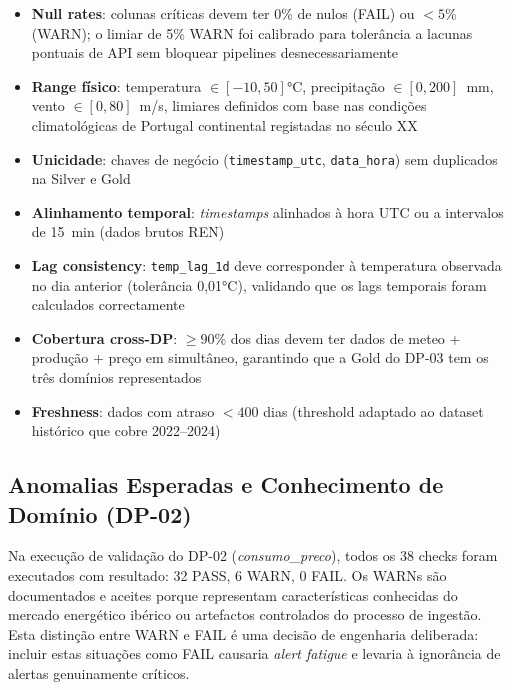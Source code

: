 \documentclass[11pt,a4paper]{article}
\begin{document}
\begin{itemize}[leftmargin=*,noitemsep]
  \item \textbf{Null rates}: colunas críticas devem ter 0\% de nulos (FAIL) ou $<5$\% (WARN); o limiar de 5\% WARN foi calibrado para tolerância a lacunas pontuais de API sem bloquear pipelines desnecessariamente
  \item \textbf{Range físico}: temperatura $\in [-10, 50]$°C, precipitação $\in [0, 200]$~mm, vento $\in [0, 80]$~m/s, limiares definidos com base nas condições climatológicas de Portugal continental registadas no século XX
  \item \textbf{Unicidade}: chaves de negócio (\texttt{timestamp\_utc}, \texttt{data\_hora}) sem duplicados na Silver e Gold
  \item \textbf{Alinhamento temporal}: \textit{timestamps} alinhados à hora UTC ou a intervalos de 15~min (dados brutos REN)
  \item \textbf{Lag consistency}: \texttt{temp\_lag\_1d} deve corresponder à temperatura observada no dia anterior (tolerância 0,01°C), validando que os lags temporais foram calculados correctamente
  \item \textbf{Cobertura cross-DP}: $\geq 90$\% dos dias devem ter dados de meteo + produção + preço em simultâneo, garantindo que a Gold do DP-03 tem os três domínios representados
  \item \textbf{Freshness}: dados com atraso $< 400$ dias (threshold adaptado ao dataset histórico que cobre 2022--2024)
\end{itemize}

\subsection{Anomalias Esperadas e Conhecimento de Domínio (DP-02)}

Na execução de validação do DP-02 (\textit{consumo\_preco}), todos os 38 checks foram executados com resultado: 32 PASS, 6 WARN, 0 FAIL. Os WARNs são documentados e aceites porque representam características conhecidas do mercado energético ibérico ou artefactos controlados do processo de ingestão. Esta distinção entre WARN e FAIL é uma decisão de engenharia deliberada: incluir estas situações como FAIL causaria \textit{alert fatigue} e levaria à ignorância de alertas genuinamente críticos.
\end{document}
